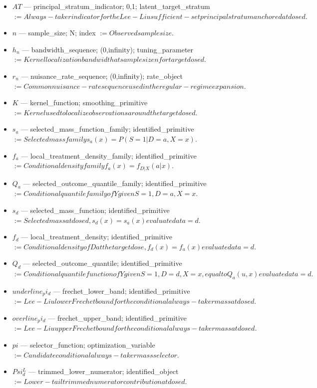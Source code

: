 \documentclass{article}
\begin{document}
\begin{itemize}
  \item $AT$ --- principal_stratum_indicator; {0,1}; latent_target_stratum $:= Always-taker indicator for the Lee-Liu sufficient-set principal stratum anchored at dose d.$
  \item $n$ --- sample_size; N; index $:= Observed sample size.$
  \item $h_n$ --- bandwidth_sequence; (0,infinity); tuning_parameter $:= Kernel localization bandwidth at sample size n for target dose d.$
  \item $r_n$ --- nuisance_rate_sequence; (0,infinity); rate_object $:= Common nuisance-rate sequence used in the regular-regime expansion.$
  \item $K$ --- kernel_function; smoothing_primitive $:= Kernel used to localize observations around the target dose d.$
  \item $s_a$ --- selected_mass_function_family; identified_primitive $:= Selected mass family s_a(x) = P(S=1 | D=a, X=x).$
  \item $f_a$ --- local_treatment_density_family; identified_primitive $:= Conditional density family f_a(x) = f_{D|X}(a|x).$
  \item $Q_a$ --- selected_outcome_quantile_family; identified_primitive $:= Conditional quantile family of Y given S=1, D=a, X=x.$
  \item $s_d$ --- selected_mass_function; identified_primitive $:= Selected mass at dose d, s_d(x) = s_a(x) evaluated at a = d.$
  \item $f_d$ --- local_treatment_density; identified_primitive $:= Conditional density of D at the target dose, f_d(x) = f_a(x) evaluated at a = d.$
  \item $Q_d$ --- selected_outcome_quantile; identified_primitive $:= Conditional quantile function of Y given S=1, D=d, X=x, equal to Q_a(u,x) evaluated at a = d.$
  \item $underline_pi_d$ --- frechet_lower_band; identified_primitive $:= Lee-Liu lower Frechet bound for the conditional always-taker mass at dose d.$
  \item $overline_pi_d$ --- frechet_upper_band; identified_primitive $:= Lee-Liu upper Frechet bound for the conditional always-taker mass at dose d.$
  \item $pi$ --- selector_function; optimization_variable $:= Candidate conditional always-taker mass selector.$
  \item $Psi_d^L$ --- trimmed_lower_numerator; identified_object $:= Lower-tail trimmed numerator contribution at dose d.$

\end{itemize}
\end{document}
